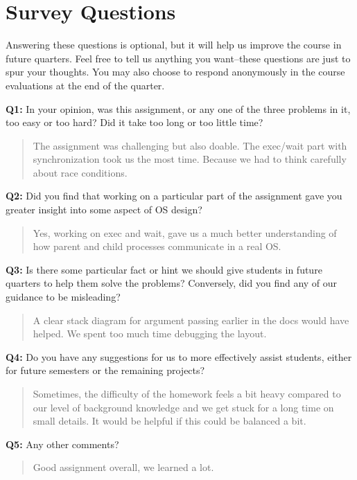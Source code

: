 \documentclass[a4paper,11pt]{paper}
\begin{document}
\section{Survey Questions}

Answering these questions is optional, but it will help us improve the course in future quarters.  Feel free to tell us anything you want--these questions are just to spur your thoughts.  You may also choose to respond anonymously in the course evaluations at the end of the quarter.

\textbf{Q1:} In your opinion, was this assignment, or any one of the three problems in it, too easy or too hard?  Did it take too long or too little time?
\begin{quote}
The assignment was challenging but also doable. The exec/wait part with synchronization took us the most time. Because we had to think carefully about race conditions.
\end{quote}

\textbf{Q2:} Did you find that working on a particular part of the assignment gave you greater insight into some aspect of OS design?
\begin{quote}
Yes, working on exec and wait, gave us a much better understanding of how parent and child processes communicate in a real OS.
\end{quote}

\textbf{Q3:} Is there some particular fact or hint we should give students in future quarters to help them solve the problems? Conversely, did you find any of our guidance to be misleading?
\begin{quote}
A clear stack diagram for argument passing earlier in the docs would have
helped. We spent too much time debugging the layout.
\end{quote}

\textbf{Q4:} Do you have any suggestions for us to more effectively assist students,
either for future semesters or the remaining projects?
\begin{quote}
Sometimes, the difficulty of the homework feels a bit heavy compared to our level of background knowledge and we get stuck for a long time on small details. It would be helpful if this could be balanced a bit.
\end{quote}

\textbf{Q5:} Any other comments?
\begin{quote}
Good assignment overall, we learned a lot.
\end{quote}
\end{document}
